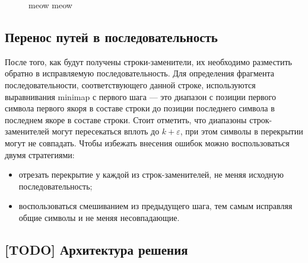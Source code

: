 \documentclass[14pt]{matmex-diploma-custom}
\begin{document}
\begin{figure}[h]
    \centering
{}
\caption{meow meow}
\label{fig:compresed_paths}
\end{figure}

\subsection{Перенос путей в последовательность}
После того, как будут получены строки-заменители, их необходимо разместить обратно в исправляемую последовательность. Для определения фрагмента последовательности, соответствующего данной строке, используются выравнивания minimap с первого шага --- это диапазон с позиции первого символа первого якоря в составе строки до позиции последнего символа в последнем якоре в составе строки. Стоит отметить, что диапазоны строк-заменителей могут пересекаться вплоть до $k+\varepsilon$, при этом символы в перекрытии могут не совпадать. Чтобы избежать внесения ошибок можно воспользоваться двумя стратегиями:
\begin{itemize}
    \item отрезать перекрытие у каждой из строк-заменителей, не меняя исходную последовательность;
    \item воспользоваться смешиванием из предыдущего шага, тем самым исправляя общие символы и не меняя несовпадающие.
\end{itemize}

\subsection{[TODO] Архитектура решения}
\end{document}
